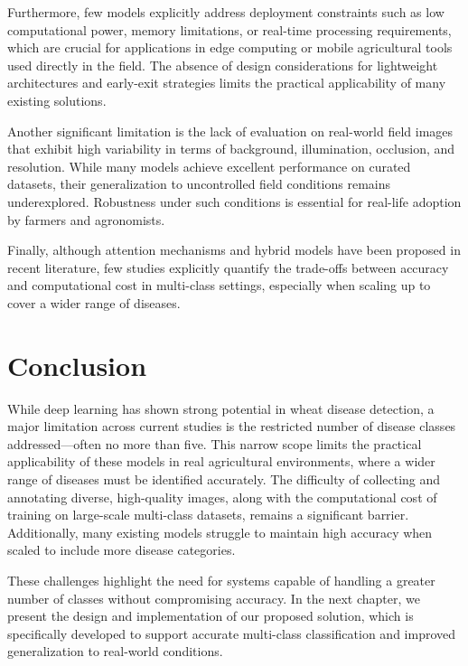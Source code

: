 Furthermore, few models explicitly address deployment constraints such as low computational power, memory limitations, or real-time processing requirements, which are crucial for applications in edge computing or mobile agricultural tools used directly in the field. The absence of design considerations for lightweight architectures and early-exit strategies limits the practical applicability of many existing solutions.

Another significant limitation is the lack of evaluation on real-world field images that exhibit high variability in terms of background, illumination, occlusion, and resolution. While many models achieve excellent performance on curated datasets, their generalization to uncontrolled field conditions remains underexplored. Robustness under such conditions is essential for real-life adoption by farmers and agronomists.

Finally, although attention mechanisms and hybrid models have been proposed in recent literature, few studies explicitly quantify the trade-offs between accuracy and computational cost in multi-class settings, especially when scaling up to cover a wider range of diseases.

\section{Conclusion}
While deep learning has shown strong potential in wheat disease detection, a major limitation across current studies is the restricted number of disease classes addressed—often no more than five. This narrow scope limits the practical applicability of these models in real agricultural environments, where a wider range of diseases must be identified accurately. The difficulty of collecting and annotating diverse, high-quality images, along with the computational cost of training on large-scale multi-class datasets, remains a significant barrier. Additionally, many existing models struggle to maintain high accuracy when scaled to include more disease categories.

These challenges highlight the need for systems capable of handling a greater number of classes without compromising accuracy. In the next chapter, we present the design and implementation of our proposed solution, which is specifically developed to support accurate multi-class classification and improved generalization to real-world conditions.